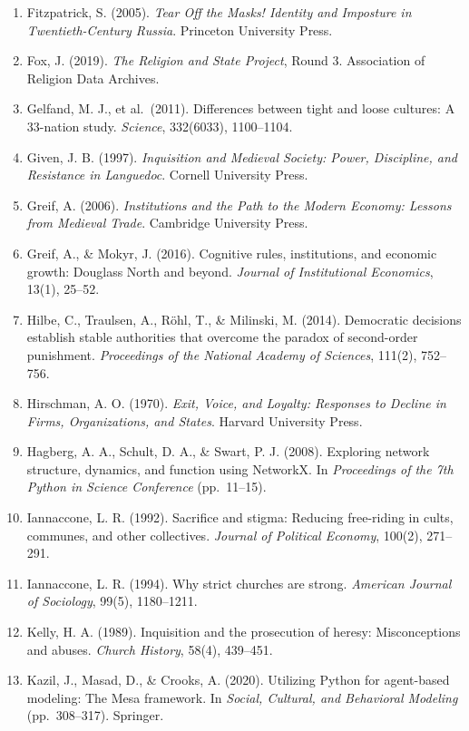\documentclass[12pt]{article}
\begin{document}
\begin{enumerate}
\item
  Fitzpatrick, S. (2005). \emph{Tear Off the Masks! Identity and Imposture in Twentieth-Century Russia}. Princeton University Press.
\item
  Fox, J. (2019). \emph{The Religion and State Project}, Round 3. Association of Religion Data Archives.
\item
  Gelfand, M. J., et al.~(2011). Differences between tight and loose cultures: A 33-nation study. \emph{Science}, 332(6033), 1100--1104.
\item
  Given, J. B. (1997). \emph{Inquisition and Medieval Society: Power, Discipline, and Resistance in Languedoc}. Cornell University Press.
\item
  Greif, A. (2006). \emph{Institutions and the Path to the Modern Economy: Lessons from Medieval Trade}. Cambridge University Press.
\item
  Greif, A., \& Mokyr, J. (2016). Cognitive rules, institutions, and economic growth: Douglass North and beyond. \emph{Journal of Institutional Economics}, 13(1), 25--52.
\item
  Hilbe, C., Traulsen, A., Röhl, T., \& Milinski, M. (2014). Democratic decisions establish stable authorities that overcome the paradox of second-order punishment. \emph{Proceedings of the National Academy of Sciences}, 111(2), 752--756.
\item
  Hirschman, A. O. (1970). \emph{Exit, Voice, and Loyalty: Responses to Decline in Firms, Organizations, and States}. Harvard University Press.
\item
  Hagberg, A. A., Schult, D. A., \& Swart, P. J. (2008). Exploring network structure, dynamics, and function using NetworkX. In \emph{Proceedings of the 7th Python in Science Conference} (pp.~11--15).
\item
  Iannaccone, L. R. (1992). Sacrifice and stigma: Reducing free-riding in cults, communes, and other collectives. \emph{Journal of Political Economy}, 100(2), 271--291.
\item
  Iannaccone, L. R. (1994). Why strict churches are strong. \emph{American Journal of Sociology}, 99(5), 1180--1211.
\item
  Kelly, H. A. (1989). Inquisition and the prosecution of heresy: Misconceptions and abuses. \emph{Church History}, 58(4), 439--451.
\item
  Kazil, J., Masad, D., \& Crooks, A. (2020). Utilizing Python for agent-based modeling: The Mesa framework. In \emph{Social, Cultural, and Behavioral Modeling} (pp.~308--317). Springer.

\end{enumerate}
\end{document}
